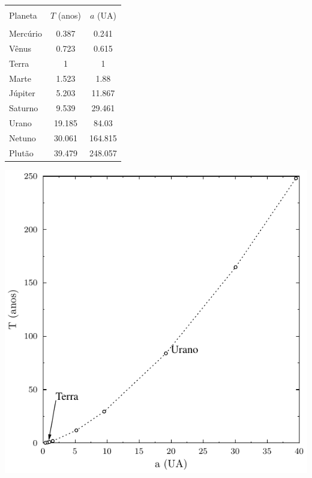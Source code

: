 \documentclass[a4paper]{article}
\begin{document}
\begin{resolucoes}
\begin{exercicio}
\begin{enumerate}
  \noindent
  \begin{minipage}[c]{0.45\textwidth}
    \begin{center}
      \begin{tabular}{lcc}
      \toprule\\
      Planeta & $T$ (anos) & $a$ (UA)\\
      \midrule\\
      Mercúrio & 0.387 &0.241\\
      Vênus & 0.723 & 0.615\\
      Terra & 1 &1\\
      Marte & 1.523 &1.88\\
      Júpiter & 5.203 &11.867\\
      Saturno & 9.539 & 29.461\\
      Urano & 19.185 & 84.03\\
      Netuno & 30.061 & 164.815\\
      Plutão & 39.479 & 248.057\\
      \bottomrule
      \end{tabular}
    \end{center}
  \end{minipage}\hfill
  \begin{minipage}[c]{0.45\textwidth}
    \includegraphics[width=\textwidth]{Txa_planetas_Sistema_Solar}
  \end{minipage}
  

\end{enumerate}
\end{exercicio}
\end{resolucoes}
\end{document}
